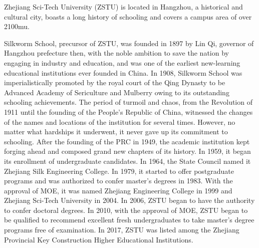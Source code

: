 \begin{englishabstract}

Zhejiang Sci-Tech University (ZSTU) is located in Hangzhou, a historical and cultural city, boasts a long history of schooling and covers a campus area of over 2100mu.

Silkworm School, precursor of ZSTU, was founded in 1897 by Lin Qi, governor of Hangzhou prefecture then, with the noble ambition to save the nation by engaging in industry and education, and was one of the earliest new-learning educational institutions ever founded in China. In 1908, Silkworm School was imperialistically promoted by the royal court of the Qing Dynasty to be Advanced Academy of Sericulture and Mulberry owing to its outstanding schooling achievements. The period of turmoil and chaos, from the Revolution of 1911 until the founding of the People’s Republic of China, witnessed the changes of the names and locations of the institution for several times. However, no matter what hardships it underwent, it never gave up its commitment to schooling. After the founding of the PRC in 1949, the academic institution kept forging ahead and composed grand new chapters of its history. In 1959, it began its enrollment of undergraduate candidates. In 1964, the State Council named it Zhejiang Silk Engineering College. In 1979, it started to offer postgraduate programs and was authorized to confer master’s degrees in 1983. With the approval of MOE, it was named Zhejiang Engineering College in 1999 and Zhejiang Sci-Tech University in 2004. In 2006, ZSTU began to have the authority to confer doctoral degrees. In 2010, with the approval of MOE, ZSTU began to be qualified to recommend excellent fresh undergraduates to take master’s degree programs free of examination. In 2017, ZSTU was listed among the Zhejiang Provincial Key Construction Higher Educational Institutions.


\end{englishabstract}
